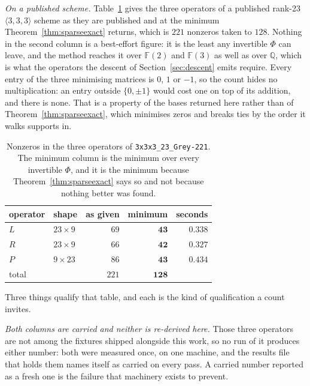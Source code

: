 \documentclass[11pt,reqno]{amsart}
\theoremstyle{plain}
\theoremstyle{definition}
\theoremstyle{remark}
\newcommand{\GF}{\mathbb{F}}
\begin{document}
\emph{On a published scheme.} Table~\ref{tab:grey221} gives the three operators
of a published rank-23 $\langle 3,3,3\rangle$ scheme as they are published and at
the minimum Theorem~\ref{thm:sparseexact} returns, which is $221$ nonzeros taken
to $128$. Nothing in the second column is a best-effort figure: it is the least
any invertible $\Phi$ can leave, and the method reaches it over $\GF(2)$ and
$\GF(3)$ as well as over $\mathbb{Q}$, which is what the operators the descent of
Section~\ref{sec:descent} emits require. Every entry of the three minimising
matrices is $0$, $1$ or $-1$, so the count hides no multiplication: an entry
outside $\{0,\pm 1\}$ would cost one on top of its addition, and there is none.
That is a property of the bases returned here rather than of
Theorem~\ref{thm:sparseexact}, which minimises zeros and breaks ties by the order
it walks supports in.

\begin{table}[ht]
\centering
\begin{tabular}{llrrr}
\toprule
operator & shape & as given & minimum & seconds \\
\midrule
$L$   & $23\times 9$ & $69$  & $\mathbf{43}$  & $0.338$ \\
$R$   & $23\times 9$ & $66$  & $\mathbf{42}$  & $0.327$ \\
$P$   & $9\times 23$ & $86$  & $\mathbf{43}$  & $0.434$ \\
\midrule
total &              & $221$ & $\mathbf{128}$ & \\
\bottomrule
\end{tabular}
\vspace{0.5em}
\caption{Nonzeros in the three operators of \texttt{3x3x3\_23\_Grey-221}. The
minimum column is the minimum over every invertible $\Phi$, and it is the
minimum because Theorem~\ref{thm:sparseexact} says so and not because nothing
better was found.}\label{tab:grey221}
\end{table}

Three things qualify that table, and each is the kind of qualification a count
invites.

\emph{Both columns are carried and neither is re-derived here.} Those three
operators are not among the fixtures shipped alongside this work, so no run of it
produces either number: both were measured once, on one machine, and the results
file that holds them names itself as carried on every pass. A carried number
reported as a fresh one is the failure that machinery exists to prevent.
\end{document}
